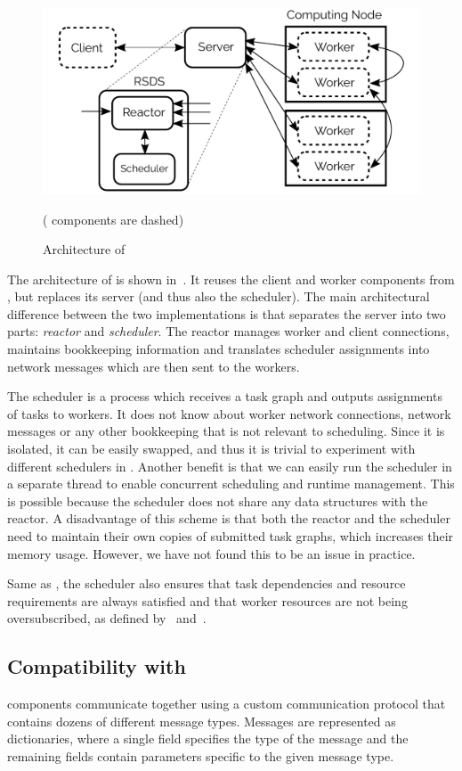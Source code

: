 \begin{figure}[h]
	\centering
	\includegraphics[width=0.6\linewidth]{./imgs/rsds/rsds-architecture}
	\caption{Architecture of \rsds{}}
	(\dask{} components are dashed)
	\label{fig:rsds-architecture}
\end{figure}

The architecture of \rsds{} is shown in~. It reuses
the client and worker components from \dask{}, but replaces its server (and
thus also the scheduler). The main architectural difference between the two implementations is that
\rsds{} separates the server into two parts: \emph{reactor} and
\emph{scheduler}. The reactor manages worker and client connections, maintains
bookkeeping information and translates scheduler assignments into \dask{}
network messages which are then sent to the workers.

The scheduler is a process which receives a task graph and outputs assignments of tasks to workers.
It does not know about worker network connections, \dask{} network messages or
any other bookkeeping that is not relevant to scheduling. Since it is isolated, it can be easily
swapped, and thus it is trivial to experiment with different schedulers in
\rsds{}. Another benefit is that we can easily run the scheduler in a separate
thread to enable concurrent scheduling and runtime management. This is possible because the
scheduler does not share any data structures with the reactor. A disadvantage of this scheme is
that both the reactor and the scheduler need to maintain their own copies of submitted task graphs,
which increases their memory usage. However, we have not found this to be an issue in practice.

Same as \dask{}, the \rsds{} scheduler also ensures that task dependencies and resource
requirements are always satisfied and that worker resources are not being oversubscribed, as defined
by~ and~.

\subsection*{Compatibility with \dask{}}
\dask{} components communicate together using a custom
communication protocol that contains dozens of different message types. Messages are represented as
dictionaries, where a single field specifies the type of the message and the remaining fields
contain parameters specific to the given message type.

